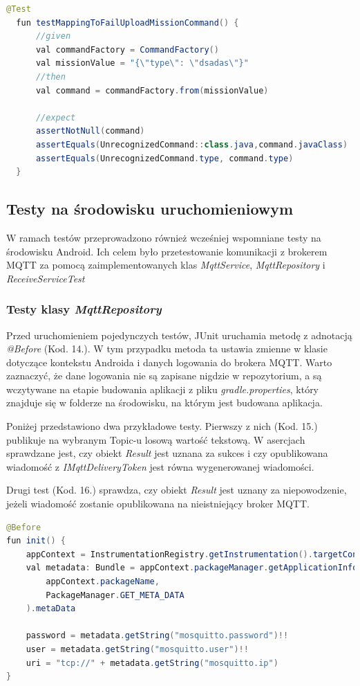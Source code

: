 \begin{lstlisting}[language=Java, caption=Test tworzenia komendy \textit{UnrecognizedCommand}]
  @Test
  fun testMappingToFailUploadMissionCommand() {
      //given
      val commandFactory = CommandFactory()
      val missionValue = "{\"type\": \"dsadas\"}"
      //then
      val command = commandFactory.from(missionValue)

      //expect
      assertNotNull(command)
      assertEquals(UnrecognizedCommand::class.java,command.javaClass)
      assertEquals(UnrecognizedCommand.type, command.type)
  }
\end{lstlisting}

\subsection{Testy na środowisku uruchomieniowym}
W ramach testów przeprowadzono również wcześniej wspomniane testy na środowisku Android. Ich celem było przetestowanie komunikacji z brokerem MQTT za pomocą zaimplementowanych klas \textit{MqttService}, \textit{MqttRepository} i \textit{ReceiveServiceTest}

\subsubsection{Testy klasy \textit{MqttRepository}}
Przed uruchomieniem pojedynczych testów, JUnit uruchamia metodę z adnotacją \textit{@Before} (Kod. 14.). W tym przypadku metoda ta ustawia zmienne w klasie dotyczące kontekstu Androida i danych logowania do brokera MQTT. Warto zaznaczyć, że dane logowania nie są zapisane nigdzie w repozytorium, a są wczytywane na etapie budowania aplikacji z pliku \textit{gradle.properties}, który znajduje się w folderze na środowisku, na którym jest budowana aplikacja.

Poniżej przedstawiono dwa przykładowe testy. Pierwszy z nich (Kod. 15.) publikuje na wybranym Topic-u losową wartość tekstową. W asercjach sprawdzane jest, czy obiekt \textit{Result} jest uznana za sukces i czy opublikowana wiadomość z \textit{IMqttDeliveryToken} jest równa wygenerowanej wiadomości.

Drugi test (Kod. 16.) sprawdza, czy obiekt \textit{Result} jest uznany za niepowodzenie, jeżeli wiadomość zostanie opublikowana na nieistniejący broker MQTT.


\newpage
\begin{lstlisting}[language=Java, caption=Inicjalizowanie wartosci dla wszystkich testów w \textit{MqttRepositoryTest}]
@Before
fun init() {
    appContext = InstrumentationRegistry.getInstrumentation().targetContext
    val metadata: Bundle = appContext.packageManager.getApplicationInfo(
        appContext.packageName,
        PackageManager.GET_META_DATA
    ).metaData

    password = metadata.getString("mosquitto.password")!!
    user = metadata.getString("mosquitto.user")!!
    uri = "tcp://" + metadata.getString("mosquitto.ip")
}
\end{lstlisting}

